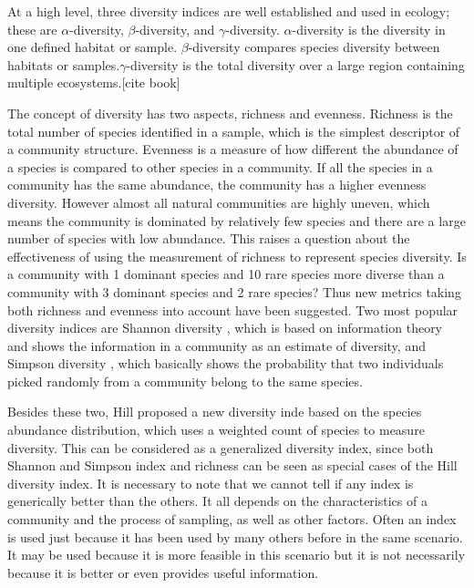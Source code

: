 At a high level, three diversity indices are well established and used in ecology; these are $\alpha$-diversity, $\beta$-diversity, and 
$\gamma$-diversity. $\alpha$-diversity is the diversity in one defined habitat or sample. $\beta$-diversity compares species 
diversity between habitats or samples.$\gamma$-diversity is the total diversity over a large region containing multiple ecosystems.[cite book]

The concept of diversity has two aspects, richness and evenness. Richness is the total number of species
identified in a sample, which is the simplest descriptor of a community structure. Evenness is a measure 
of how different the abundance of a species is compared to other species in a community. If all the species in a
 community has the same abundance, the community has a higher evenness diversity. However almost all natural communities 
 are highly uneven, which means the community is dominated by relatively few species and there are a large number of species
 with low abundance. This raises
 a question about the effectiveness of using the measurement of richness to represent species diversity. Is a community
 with 1 dominant species and 10 rare species more diverse than a community with 3 dominant species and 2 rare species?
  Thus new metrics taking both richness and evenness into account have been suggested. Two most popular diversity indices are Shannon diversity \cite{shannon2001mathematical},
  which is based on information theory and shows the information in a community as an estimate of diversity, and Simpson diversity \cite{simpson1949measurement},
  which basically shows the probability that two individuals picked randomly from a community belong to the same species.

Besides these two, Hill \cite{hill1973diversity} proposed a new diversity inde based on the species abundance distribution, which uses a weighted count of species to measure 
diversity. This can be considered as a generalized diversity index, 
since both Shannon and Simpson index and richness can be seen as special cases of the Hill diversity index.
It is necessary to note that we cannot tell if any index is generically better than the others. It all depends on the characteristics
of a community and the process of sampling, as well as other factors. Often an index is used just because it has
been used by many others before in the same scenario. It may be used because it is more feasible in this scenario 
but it is not necessarily because it is better or even provides useful information.

